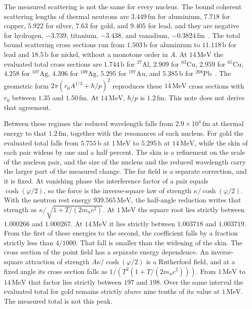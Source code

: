 \documentclass[a4paper]{article}
\begin{document}
The measured scattering is not the same for every nucleus. The bound coherent scattering lengths of thermal neutrons are \(3.449\,\mathrm{fm}\) for aluminium, \(7.718\) for copper, \(5.922\) for silver, \(7.63\) for gold, and \(9.405\) for lead, and they are negative for hydrogen, \(-3.739\), titanium, \(-3.438\), and vanadium, \(-0.3824\,\mathrm{fm}\)~\cite{sears1992}. The total bound scattering cross sections run from \(1.503\,\mathrm{b}\) for aluminium to \(11.118\,\mathrm{b}\) for lead and \(18.5\,\mathrm{b}\) for nickel, without a monotone order in \(A\). At \(14\,\mathrm{MeV}\) the evaluated total cross sections are \(1.744\,\mathrm{b}\) for \({}^{27}\mathrm{Al}\), \(2.909\) for \({}^{63}\mathrm{Cu}\), \(2.959\) for \({}^{65}\mathrm{Cu}\), \(4.258\) for \({}^{107}\mathrm{Ag}\), \(4.396\) for \({}^{109}\mathrm{Ag}\), \(5.295\) for \({}^{197}\mathrm{Au}\), and \(5.385\,\mathrm{b}\) for \({}^{208}\mathrm{Pb}\)~\cite{endf8}. The geometric form \(2\pi(r_0A^{1/3}+\hbar/p)^{2}\) reproduces these \(14\,\mathrm{MeV}\) cross sections with \(r_0\) between \(1.35\) and \(1.50\,\mathrm{fm}\). At \(14\,\mathrm{MeV}\), \(\hbar/p\) is \(1.2\,\mathrm{fm}\). This note does not derive that agreement.

Between these regimes the reduced wavelength falls from \(2.9\times 10^{4}\,\mathrm{fm}\) at thermal energy to that \(1.2\,\mathrm{fm}\), together with the resonances of each nucleus. For gold the evaluated total falls from \(5.755\,\mathrm{b}\) at \(1\,\mathrm{MeV}\) to \(5.295\,\mathrm{b}\) at \(14\,\mathrm{MeV}\), while the skin of each pair widens by one and a half percent. The skin is a refinement on the scale of the nucleon pair, and the size of the nucleus and the reduced wavelength carry the larger part of the measured change. The far field is a separate correction, and it is fixed. At vanishing phase the interference factor of a pair equals \(\cosh(\varphi/2)\), so the force is the inverse-square law of strength \(\kappa/\cosh(\varphi/2)\). With the neutron rest energy \(939.565\,\mathrm{MeV}\), the half-angle reduction writes that strength as \(\kappa/\sqrt{1+T/(2m_n c^{2})}\). At \(1\,\mathrm{MeV}\) the square root lies strictly between \(1.000266\) and \(1.000267\). At \(14\,\mathrm{MeV}\) it lies strictly between \(1.003718\) and \(1.003719\). From the first of these energies to the second, the coefficient falls by a fraction strictly less than \(4/1000\). That fall is smaller than the widening of the skin. The cross section of the point field has a separate energy dependence. An inverse-square attraction of strength \(A\kappa/\cosh(\varphi/2)\) is a Rutherford field, and at a fixed angle its cross section falls as \(1/(T^{2}(1+T/(2m_n c^{2})))\). From \(1\,\mathrm{MeV}\) to \(14\,\mathrm{MeV}\) that factor lies strictly between \(197\) and \(198\). Over the same interval the evaluated total for gold remains strictly above nine tenths of its value at \(1\,\mathrm{MeV}\). The measured total is not this peak.
\end{document}
